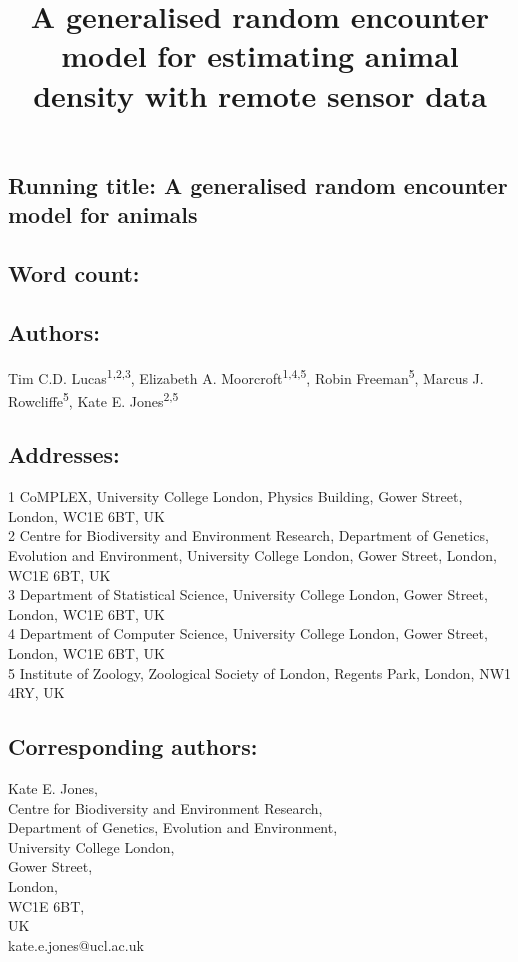 \documentclass[a4paper,10pt,reqno,oneside]{amsart}
\begin{document}
\title[Lucas \emph{et al.}: A generalised random encounter model for animals]{A generalised random encounter model for estimating animal density with remote sensor data}
\maketitle

\subsection*{ Running title: A generalised random encounter model for animals}

\subsection*{ Word count:}

\subsection*{ Authors:\\}
Tim C.D. Lucas\textsuperscript{1,2,3}, Elizabeth A. Moorcroft\textsuperscript{1,4,5}, Robin Freeman\textsuperscript{5}, Marcus J. Rowcliffe\textsuperscript{5}, Kate E. Jones\textsuperscript{2,5}


\subsection*{ Addresses:\\}
1 CoMPLEX, University College London, Physics Building, Gower Street, London, WC1E 6BT, UK\\ 
2 Centre for Biodiversity and Environment Research, Department of Genetics, Evolution and Environment, University College London, Gower Street, London, WC1E 6BT, UK\\ 
3 Department of Statistical Science, University College London, Gower Street, London, WC1E 6BT, UK\\ 
4 Department of Computer Science, University College London, Gower Street, London, WC1E 6BT, UK\\ 
5 Institute of Zoology, Zoological Society of London, Regents Park, London, NW1 4RY, UK


\subsection*{ Corresponding authors:\\}
Kate E. Jones,\\
Centre for Biodiversity and Environment Research,\\
Department of Genetics, Evolution and Environment,\\
University College London,\\
Gower Street,\\
London,\\
WC1E 6BT, \\
UK\\
kate.e.jones@ucl.ac.uk\\
\end{document}
